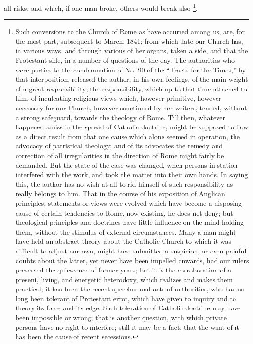 all risks, and which, if one man broke, others would break also \footnote{Such conversions to the Church of Rome as
have occurred among us, are, for the most part, subsequent to March,
1841; from which date our Church has, in various ways, and through
various of her organs, taken a side, and that the Protestant side, in
a number of questions of the day. The authorities who were parties to
the condemnation of No. 90 of the ``Tracts for the Times,'' by
that interposition, released the author, in his own feelings, of the
main weight of a great responsibility; the responsibility, which up to
that time attached to him, of inculcating religious views which,
however primitive, however necessary for our Church, however
sanctioned by her writers, tended, without a strong safeguard, towards
the theology of Rome. Till then, whatever happened amiss in the spread
of Catholic doctrine, might be supposed to flow as a direct result
from that one cause which alone seemed in operation, the advocacy of
patristical theology; and of its advocates the remedy and correction
of all irregularities in the direction of Rome might fairly be
demanded. But the state of the case was changed, when persons in
station interfered with the work, and took the matter into their own
hands. In saying this, the author has no wish at all to rid himself of
such responsibility as really belongs to him. That in the course of
his exposition of Anglican principles, statements or views were
evolved which have become a disposing cause of certain tendencies to
Rome, now existing, he does not deny; but theological principles and
doctrines have little influence on the mind holding them, without the
stimulus of external circumstances. Many a man might have held an
abstract theory about the Catholic Church to which it was difficult to
adjust our own, might have submitted a suspicion, or even painful
doubts about the latter, yet never have been impelled onwards, had our
rulers preserved the quiescence of former years; but it is the
corroboration of a present, living, and energetic heterodoxy, which
realizes and makes them practical; it has been the recent speeches and
acts of authorities, who had so long been tolerant of Protestant
error, which have given to inquiry and to theory its force and its
edge. Such toleration of Catholic doctrine may have been impossible or
wrong; that is another question, with which private persons have no
right to interfere; still it may be a fact, that the want of it has
been the cause of recent secessions.}.

